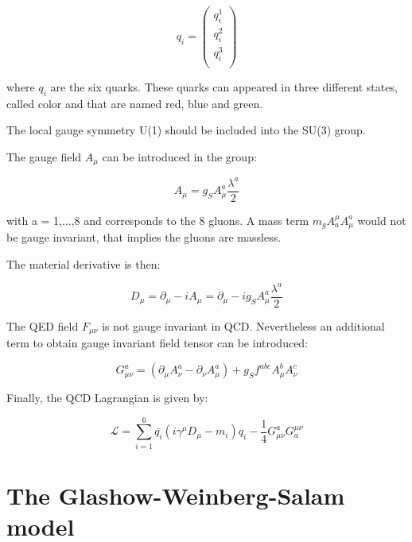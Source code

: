     \begin{equation}
      q_i = 
        \begin{pmatrix}
          q_i^1 \\
          q_i^2 \\
          q_i^3 \\
        \end{pmatrix}
     \end{equation}
    
    where $q_i$ are the six quarks.
    These quarks can appeared in three different states, called color and that are named red, blue and green.

    The local gauge symmetry U(1) should be included into the SU(3) group.
    
    The gauge field $A_{\mu}$ can be introduced in the group:
    
    \begin{equation}
      A_{\mu} = g_S A^a_{\mu}\frac{\lambda^a}{2}
    \end{equation}
     
    with a = 1,...,8 and corresponds to the 8 gluons.
    A mass term  $m_g A^{\mu}_a A^a_{\mu}$ would not be gauge invariant, that implies the gluons are massless.

    The material derivative is then:

    \begin{equation}
      D_{\mu} = \partial_{\mu} - i A_{\mu} = \partial_{\mu} - i g_S A^a_{\mu} \frac{\lambda^a}{2}
    \end{equation}

    The QED field $F_{\mu \nu}$ is not gauge invariant in QCD.
    Nevertheless an additional term to obtain gauge invariant field tensor can be introduced:
    
    \begin{equation}
      G^a_{\mu \nu} = \left( \partial_{\mu} A^a_{\nu} - \partial_{\nu} A^a_{\mu} \right) + g_S f^{abc} A^b_{\mu} A^c_{\nu}
    \end{equation} 

    Finally, the QCD Lagrangian is given by:

    \begin{equation}
      \mathcal{L} = \sum_{i=1}^6  \bar{q_i} \left(i \gamma^{\mu}D_{\mu} -m_i \right)q_i - \frac{1}{4} G_{\mu \nu}^{a} G_{a}^{\mu \nu}
    \end{equation}
    

    \section{The Glashow-Weinberg-Salam model}

